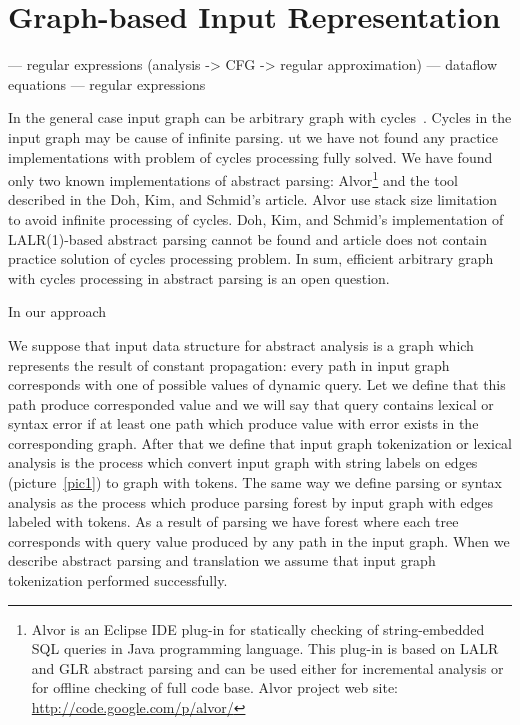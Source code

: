 \section{Graph-based Input Representation}

\cite{StringExpr} --- regular expressions (analysis -> CFG -> regular approximation)
\cite{AbstrParsing} --- dataflow equations
\cite{ALVOR1,ALVOR2} --- regular expressions

In the general case input graph can be arbitrary graph with cycles~\cite{AbstrParsing}. Cycles in the input graph may 
be cause of infinite parsing. ut we have not found any practice implementations with problem of cycles processing fully 
solved. We have found only two known implementations of abstract parsing: Alvor\footnote{Alvor is an Eclipse IDE plug-in 
for statically checking of string-embedded SQL queries in Java programming language. This plug-in is based on LALR and GLR 
abstract parsing and can be used either for incremental analysis or for offline checking of full code base. Alvor project 
web site: \href{http://code.google.com/p/alvor/}{http://code.google.com/p/alvor/}} and the tool described in the Doh, Kim, 
and Schmid's article. Alvor use stack size limitation to avoid infinite processing of cycles. Doh, Kim, and Schmid's 
implementation of LALR(1)-based abstract parsing cannot be found and article does not contain practice solution of 
cycles processing problem. In sum, efficient arbitrary graph with cycles processing in abstract parsing is an open question.
	


In our approach 

We suppose that input data structure for abstract analysis is a graph which represents the result of constant
propagation: every path in input graph corresponds with one of possible values of dynamic query. Let we define 
that this path produce corresponded value and we will say that query contains lexical or syntax error if at least 
one path which produce value with error exists in the corresponding graph. After that we define that input graph 
tokenization or lexical analysis is the process which convert input graph with string labels on edges (picture~\ref{pic1}) 
to graph with tokens. The same way we define parsing or syntax analysis as the process which produce parsing forest by 
input graph with edges labeled with tokens. As a result of parsing we have forest where each tree corresponds with query 
value produced by any path in the input graph. When we describe abstract parsing and translation we assume that input 
graph tokenization performed successfully.


